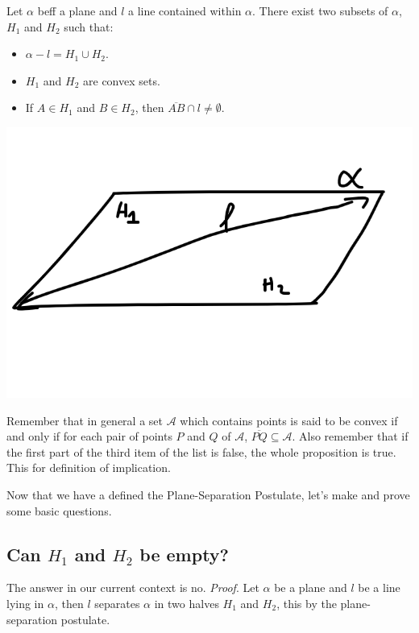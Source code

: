 \documentclass[11pt]{article}
\begin{document}
    Let $\alpha$ beff a plane and $l$ a line contained within $\alpha$. There exist two subsets of $\alpha$, $H_1$ and $H_2$ such that:
    \begin{itemize}
        \item $\alpha - l = H_1 \cup H_2$.
        \item $H_1$ and $H_2$ are convex sets.
        \item If $A \in H_1$ and $B \in H_2$, then $\overline{AB} \cap l \not = \emptyset$.
    \end{itemize}
    \begin{center}
        \includegraphics[scale=0.2]{image1.png}
    \end{center}
    Remember that in general a set $\mathcal{A}$ which contains points is said to be convex if and only if for each pair of points $P$ and $Q$ of $\mathcal{A}$, $\overline{PQ} \subseteq \mathcal{A}$.
    Also remember that if the first part of the third item of the list is false, the whole proposition is true. This for definition of implication.

    Now that we have a defined the Plane-Separation Postulate, let's make and prove some basic questions.

    \subsection{Can $H_1$ and $H_2$ be empty?}
        The answer in our current context is no. \textit{Proof}. Let $\alpha$ be a plane and $l$ be a line lying in $\alpha$, then $l$ separates $\alpha$ in two halves $H_1$ and $H_2$, this by the plane-separation postulate.\\
\end{document}

